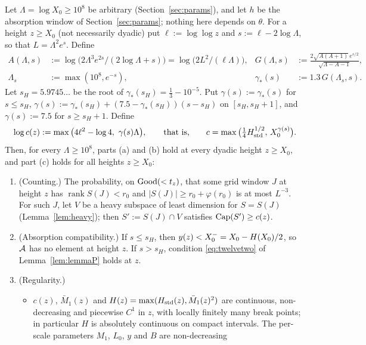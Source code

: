 \begin{theorem}\label{thm:caplw}
Let $\Lambda=\log X_0\ge10^8$ be arbitrary (Section~\ref{sec:params}), and let $h$ be the absorption window of
Section~\ref{sec:params}; nothing here depends on $\theta$. For a height $z\ge X_0$
(not necessarily dyadic) put $\ell:=\log\log z$ and $s:=\ell-2\log\Lambda$, so that $L=\Lambda^2e^s$. Define
\begin{align*}
A(\Lambda,s)&:=\log\big(2\Lambda^3e^{2s}/(2\log\Lambda+s)\big)=\log\big(2L^2/(\ell\Lambda)\big),&
G(\Lambda,s)&:=\frac{2\sqrt{A(A+1)}\,e^{s/2}}{\sqrt{\Lambda-A-1}},\\
\Lambda_s&:=\max(10^8,e^{-s}),& \gamma_*(s)&:=1.3\,G(\Lambda_s,s).
\end{align*}
Let $s_H=5.9745\ldots$ be the root of $\gamma_*(s_H)=\tfrac13-10^{-5}$. Put $\gamma(s):=\gamma_*(s)$ for $s\le s_H$,
$\gamma(s):=\gamma_*(s_H)+(7.5-\gamma_*(s_H))(s-s_H)$ on $[s_H,s_H+1]$, and $\gamma(s):=7.5$ for $s\ge s_H+1$. Define
\[
\log c(z):=\max\big(4\ell^2-\log4,\ \gamma(s)\Lambda\big),\qquad\text{that is,}\qquad
c=\max\big(\tfrac14\qHstd^{1/2},\,X_0^{\gamma(s)}\big).
\]
Then, for every $\Lambda\ge10^8$, parts (a) and (b) hold at every dyadic height $z\ge X_0$, and part (c) holds for all
heights $z\ge X_0$:
\begin{enumerate}[label=\textup{(\alph*)}]
\item (Counting.) The probability, on $\mathrm{Good}(<t_z)$, that some grid window $J$ at height $z$ has
  $\operatorname{rank}S(J)<r_0$ and $|S(J)|\ge r_0+\varphi(r_0)$ is at most $L^{-3}$. For such $J$, let $V$ be a heavy
  subspace of least dimension for $S=S(J)$ (Lemma~\ref{lem:heavy}); then $S':=S(J)\cap V$ satisfies $\operatorname{Cap}(S')\ge c(z)$.
\item (Absorption compatibility.) If $s\le s_H$, then $y(z)<X_0^{-}=X_0-H(X_0)/2$, so $\mathcal{A}$ has no element at height $z$. If
  $s>s_H$, condition \eqref{eq:twelvetwo} of Lemma~\ref{lem:lemmaP} holds at $z$.
\item (Regularity.)
  \begin{itemize}
  \item $c(z)$, $\bar M_1(z)$ and $H(z)=\max(H_{\mathrm{std}}(z),\bar M_1(z)^2)$ are continuous, non-decreasing and piecewise $C^1$
    in $z$, with locally finitely many break points; in particular $H$ is absolutely continuous on compact intervals. The per-scale parameters $M_1$, $L_0$, $y$ and $B$ are non-decreasing

\end{itemize}
\end{enumerate}
\end{theorem}
